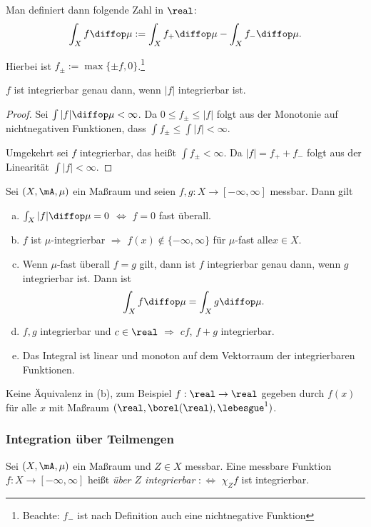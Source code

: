 Man definiert dann folgende Zahl in $\real$:
\[ \int_X f \diffop \mu := \int_X f_+ \diffop \mu - \int_X f_- \diffop \mu. \]

Hierbei ist $f_\pm := \max \{ \pm f, 0 \}$.\footnote{Beachte: $f_-$ ist nach Definition auch eine nichtnegative Funktion}

\begin{rmrk}
 $f$ ist integrierbar genau dann, wenn $|f|$ integrierbar ist.
 \begin{proof}
  Sei $\int |f| \diffop \mu < \infty$. Da $0 \le f_\pm \le |f|$ folgt aus der Monotonie auf nichtnegativen Funktionen, dass $\int f_\pm \le \int |f| < \infty$.
  
  Umgekehrt sei $f$ integrierbar, das heißt $\int f_\pm < \infty$. Da $|f| = f_+ + f_-$ folgt aus der Linearität $\int |f| < \infty$.
 \end{proof}
\end{rmrk}

\begin{thm}
 Sei $(X,\mA,\mu)$ ein Maßraum und seien $f,g:X \to [-\infty, \infty]$ messbar. Dann gilt
 \begin{enumerate}[(a)]
  \item $\int_X |f| \diffop \mu = 0$ $\Leftrightarrow$ $f=0$ fast überall.
  \item $f$ ist $\mu$-integrierbar $\Rightarrow$ $f(x) \notin \{ -\infty, \infty \}$ für $\mu$-fast alle\footnotemark $x \in X$.
  \item Wenn $\mu$-fast überall $f=g$ gilt, dann ist $f$ integrierbar genau dann, wenn $g$ integrierbar ist. Dann ist
  \[ \int_X f \diffop \mu = \int_X g \diffop \mu. \]
  \item $f,g$ integrierbar und $c \in \real$ $\Rightarrow$ $cf$, $f+g$ integrierbar.
  \item Das Integral ist linear und monoton auf dem Vektorraum der integrierbaren Funktionen.
 \end{enumerate}
\end{thm}

\begin{rmrk}
 Keine Äquivalenz in (b), zum Beispiel $f: \real \to \real$ gegeben durch $f(x)$ für alle $x$ mit Maßraum $(\real, \borel(\real), \lebesgue^1 )$.
\end{rmrk}

\subsubsection{Integration über Teilmengen}
 Sei $(X,\mA,\mu)$ ein Maßraum und $Z \in X$ messbar. Eine messbare Funktion $f:X \to [-\infty,\infty]$ heißt \emph{über $Z$ integrierbar} $:\Leftrightarrow$ $\chi_Z f$ ist integrierbar. 
 

